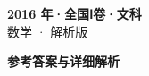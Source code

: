 \documentclass[zihao=-4, a4paper]{ctexart}
\begin{document}
\begin{center}
  {\Large\bfseries 2016 年·全国Ⅰ卷·文科}\\[4pt]
  {\large 数学 · 解析版}
\end{center}
\medskip
{}

\clearpage
{}
\begin{center}{\Large\bfseries 参考答案与详细解析}\end{center}
\medskip

\end{document}
